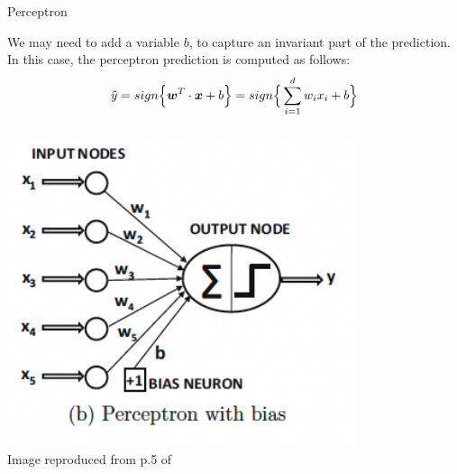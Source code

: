 %
%
%

\begin{frame}[t]{Perceptron}

    We may need to add a  variable $b$, 
    to capture an invariant part of the prediction. 
    In this case, the \gls{perceptron} prediction is computed as follows:
    \begin{equation}
        \hat{y} = 
            sign\Big\{ \boldsymbol{w}^T \cdot \boldsymbol{x} + b \Big\} = 
            sign\Big\{ \sum_{i=1}^{d} w_i x_i + b \Big\}
            \label{eq:perceptron_prediction_w_bias}    
    \end{equation}

    \vspace{-1.0cm}

    \begin{columns}
        \begin{column}{0.50\textwidth}
         \begin{center}
            \includegraphics[width=0.95\textwidth]{./images/perceptron/perceptron_with_bias.png}\\
            {\scriptsize \color{col:attribution} 
            Image reproduced from p.5 of \cite{Aggarwal:2018SpringerDL}}\\
         \end{center}
        \end{column}
        \begin{column}{0.50\textwidth}
            \begin{itemize}

\end{itemize}
\end{column}
\end{columns}
\end{frame}
